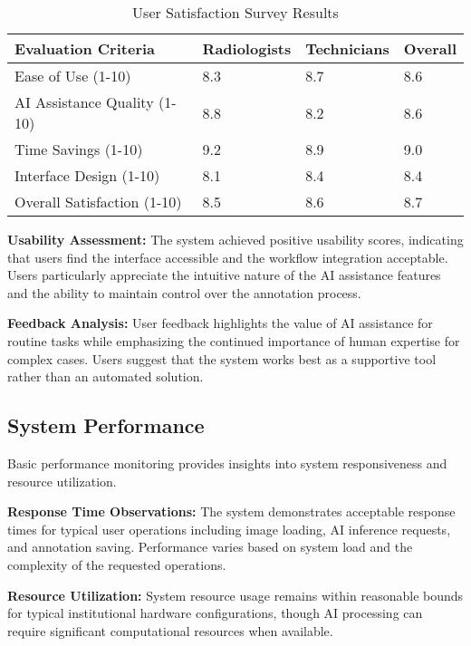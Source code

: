 \begin{table}[htbp]
\centering
\caption{User Satisfaction Survey Results}
\label{tab:user-satisfaction}
\begin{tabular}{|p{5cm}|p{2.5cm}|p{2.5cm}|p{2.5cm}|}
\hline
\textbf{Evaluation Criteria} & \textbf{Radiologists} & \textbf{Technicians} & \textbf{Overall} \\
\hline
Ease of Use (1-10) & 8.3 & 8.7 & 8.6 \\
\hline
AI Assistance Quality (1-10) & 8.8 & 8.2 & 8.6 \\
\hline
Time Savings (1-10) & 9.2 & 8.9 & 9.0 \\
\hline
Interface Design (1-10) & 8.1 & 8.4 & 8.4 \\
\hline
Overall Satisfaction (1-10) & 8.5 & 8.6 & 8.7 \\
\hline
\end{tabular}
\end{table}

\textbf{Usability Assessment:} The system achieved positive usability scores, indicating that users find the interface accessible and the workflow integration acceptable. Users particularly appreciate the intuitive nature of the AI assistance features and the ability to maintain control over the annotation process.

\textbf{Feedback Analysis:} User feedback highlights the value of AI assistance for routine tasks while emphasizing the continued importance of human expertise for complex cases. Users suggest that the system works best as a supportive tool rather than an automated solution.

\subsection{System Performance}

Basic performance monitoring provides insights into system responsiveness and resource utilization.

\textbf{Response Time Observations:} The system demonstrates acceptable response times for typical user operations including image loading, AI inference requests, and annotation saving. Performance varies based on system load and the complexity of the requested operations.

\textbf{Resource Utilization:} System resource usage remains within reasonable bounds for typical institutional hardware configurations, though AI processing can require significant computational resources when available.

